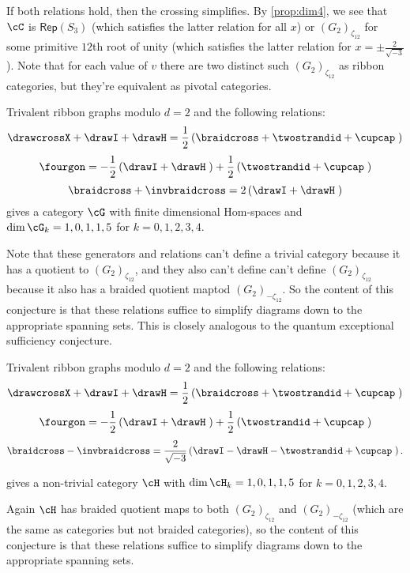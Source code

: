 \documentclass[12pt]{amsart}
\begin{document}
If both relations hold, then the crossing simplifies.  By \ref{prop:dim4}, we
see that $\cC$ is $\mathsf{Rep}(S_3)$ (which satisfies the latter relation for
all $x$) or $(G_2)_{\zeta_{12}}$ for some primitive $12$th root of unity
(which satisfies the latter relation for $x = \pm \frac{2}{\sqrt{-3}}$). Note
that for each value of $v$ there are two distinct such $(G_2)_{\zeta_{12}}$ as
ribbon categories, but they're equivalent as pivotal categories.

\begin{conjecture}
Trivalent ribbon graphs modulo $d=2$ and the following relations:
$$\drawcrossX + \drawI + \drawH = \frac{1}{2} \left(\braidcross + \twostrandid + \cupcap \;\right)$$
$$\fourgon = -\frac{1}{2} \left(\drawI + \drawH \;\right) + \frac{1}{2} \left(\twostrandid + \cupcap\;\right)$$
$$\braidcross + \invbraidcross = 2 \left(\drawI + \drawH \;\right)$$
gives a category $\cG$ with finite dimensional Hom-spaces and $\dim \cG_k = 1,0,1,1,5$ for $k = 0,1,2,3,4$.  
\end{conjecture}

Note that these generators and relations can't define a trivial category
because it has a quotient to  $(G_2)_{\zeta_{12}}$, and they also can't define
can't define $(G_2)_{\zeta_{12}}$ because it also has a braided quotient maptod $(G_2)_{-\zeta_{12}}$.  So the content of this conjecture
is that these relations suffice to simplify diagrams down to the appropriate
spanning sets.  This is closely analogous to the quantum exceptional sufficiency conjecture.

\begin{conjecture}
Trivalent ribbon graphs modulo $d=2$ and the following relations:
$$\drawcrossX + \drawI + \drawH = \frac{1}{2} \left(\braidcross + \twostrandid + \cupcap \;\right)$$
$$\fourgon = -\frac{1}{2} \left(\drawI + \drawH \;\right) + \frac{1}{2} \left(\twostrandid + \cupcap\;\right)$$
$$\braidcross - \invbraidcross = \frac{2}{\sqrt{-3}} \left(\drawI - \drawH - \twostrandid + \cupcap\;\right).$$

gives a non-trivial category $\cH$ with $\dim \cH_k = 1,0,1,1,5$ for $k = 0,1,2,3,4$.  
\end{conjecture}

Again $\cH$ has braided quotient maps to both $(G_2)_{\zeta_{12}}$ and
$(G_2)_{-\zeta_{12}}$ (which are the same as categories but not braided
categories), so the content of this conjecture is that these relations suffice
to simplify diagrams down to the appropriate spanning sets.
\end{document}
